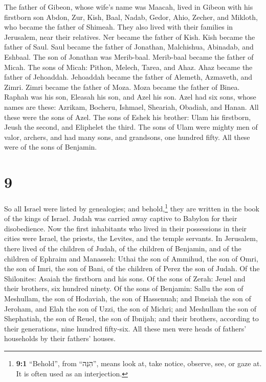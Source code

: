  The father of Gibeon, whose wife's name was Maacah,
lived in Gibeon  with his firstborn son Abdon, Zur, Kish,
Baal, Nadab,  Gedor, Ahio, Zecher,  and
Mikloth, who became the father of Shimeah. They also lived with their
families in Jerusalem, near their relatives.  Ner became
the father of Kish. Kish became the father of Saul. Saul became the
father of Jonathan, Malchishua, Abinadab, and Eshbaal. 
The son of Jonathan was Merib-baal. Merib-baal became the father of
Micah.  The sons of Micah: Pithon, Melech, Tarea, and
Ahaz.  Ahaz became the father of Jehoaddah. Jehoaddah
became the father of Alemeth, Azmaveth, and Zimri. Zimri became the
father of Moza.  Moza became the father of Binea. Raphah
was his son, Eleasah his son, and Azel his son.  Azel had
six sons, whose names are these: Azrikam, Bocheru, Ishmael, Sheariah,
Obadiah, and Hanan. All these were the sons of Azel.  The
sons of Eshek his brother: Ulam his firstborn, Jeush the second, and
Eliphelet the third.  The sons of Ulam were mighty men of
valor, archers, and had many sons, and grandsons, one hundred fifty. All
these were of the sons of Benjamin.

\hypertarget{section-8}{%
\section{9}\label{section-8}}

 So all Israel were listed by genealogies; and
behold,\footnote{\textbf{9:1} ``Behold'', from ``הִנֵּה'', means look
  at, take notice, observe, see, or gaze at. It is often used as an
  interjection.} they are written in the book of the kings of Israel.
Judah was carried away captive to Babylon for their disobedience.
 Now the first inhabitants who lived in their possessions
in their cities were Israel, the priests, the Levites, and the temple
servants.  In Jerusalem, there lived of the children of
Judah, of the children of Benjamin, and of the children of Ephraim and
Manasseh:  Uthai the son of Ammihud, the son of Omri, the
son of Imri, the son of Bani, of the children of Perez the son of Judah.
 Of the Shilonites: Asaiah the firstborn and his sons.
 Of the sons of Zerah: Jeuel and their brothers, six
hundred ninety.  Of the sons of Benjamin: Sallu the son of
Meshullam, the son of Hodaviah, the son of Hassenuah;  and
Ibneiah the son of Jeroham, and Elah the son of Uzzi, the son of Michri;
and Meshullam the son of Shephatiah, the son of Reuel, the son of
Ibnijah;  and their brothers, according to their
generations, nine hundred fifty-six. All these men were heads of
fathers' households by their fathers' houses.

